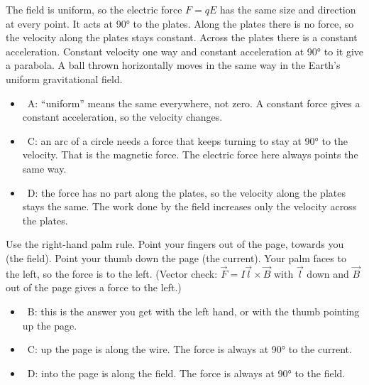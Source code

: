 \begin{practiceanswers}

\begin{practiceans}
  The field is uniform, so the electric force $F = qE$ has the same size and direction at
  every point. It acts at \ang{90} to the plates. Along the plates there is no force, so the
  velocity along the plates stays constant. Across the plates there is a constant
  acceleration. Constant velocity one way and constant acceleration at \ang{90} to it give a
  parabola. A ball thrown horizontally moves in the same way in the Earth's uniform
  gravitational field.
  \begin{itemize}
    \item \xmark\ A: ``uniform'' means the same everywhere, not zero. A constant force gives
          a constant acceleration, so the velocity changes.
    \item \xmark\ C: an arc of a circle needs a force that keeps turning to stay at
          \ang{90} to the velocity. That is the magnetic force. The electric force here
          always points the same way.
    \item \xmark\ D: the force has no part along the plates, so the velocity along the
          plates stays the same. The work done by the field increases only the velocity
          across the plates.
  \end{itemize}
\end{practiceans}

\begin{practiceans}
  Use the right-hand palm rule. Point your fingers out of the page, towards you (the field).
  Point your thumb down the page (the current). Your palm faces to the left, so the force is
  to the left. (Vector check: $\vec{F} = I\vec{l} \times \vec{B}$ with $\vec{l}$ down and
  $\vec{B}$ out of the page gives a force to the left.)
  \begin{itemize}
    \item \xmark\ B: this is the answer you get with the left hand, or with the thumb
          pointing up the page.
    \item \xmark\ C: up the page is along the wire. The force is always at \ang{90} to the
          current.
    \item \xmark\ D: into the page is along the field. The force is always at \ang{90} to
          the field.
  \end{itemize}
\end{practiceans}


\end{practiceanswers}
